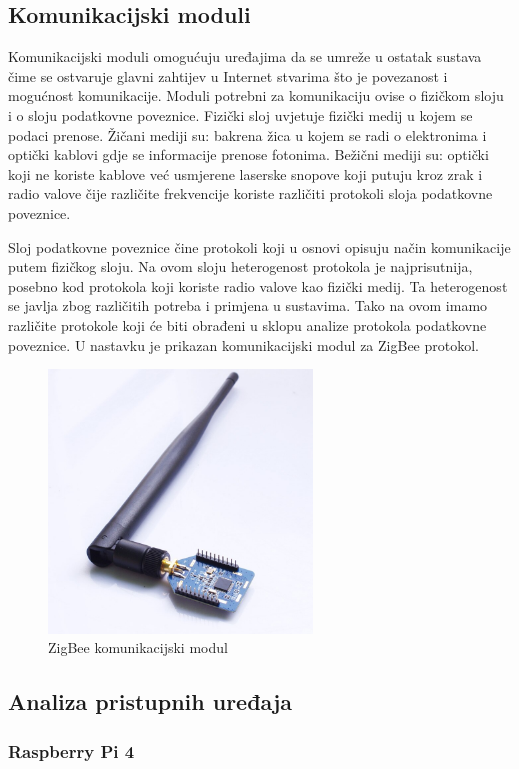 \documentclass[times, utf8, diplomski]{fer}
\begin{document}
\subsection{Komunikacijski moduli}
Komunikacijski moduli omogućuju uređajima da se umreže u ostatak sustava čime se ostvaruje glavni zahtijev u Internet stvarima što je povezanost i mogućnost komunikacije. Moduli potrebni za komunikaciju ovise o fizičkom sloju i o sloju podatkovne poveznice. Fizički sloj uvjetuje fizički medij u kojem se podaci prenose. Žičani mediji su: bakrena žica u kojem se radi o elektronima i optički kablovi gdje se informacije prenose fotonima. Bežični mediji su: optički koji ne koriste kablove već usmjerene laserske snopove koji putuju kroz zrak i radio valove čije različite frekvencije koriste različiti protokoli sloja podatkovne poveznice. 

Sloj podatkovne poveznice čine protokoli koji u osnovi opisuju način komunikacije putem fizičkog sloju. Na ovom sloju heterogenost protokola je najprisutnija, posebno kod protokola koji koriste radio valove kao fizički medij. Ta heterogenost se javlja zbog različitih potreba i primjena u sustavima. Tako na ovom imamo različite protokole koji će biti obrađeni u sklopu analize protokola podatkovne poveznice. U nastavku je prikazan komunikacijski modul za ZigBee protokol.
\begin{figure}[htb]
    \centering
    \includegraphics[width=7cm]{images/zigbee-module.jpg}
    \caption{ZigBee komunikacijski modul\citep{ZigBeemodule}}
    \label{fig:zigbeemodule}
\end{figure}

\subsection{Analiza pristupnih uređaja}
\subsubsection{Raspberry Pi 4}
\end{document}
